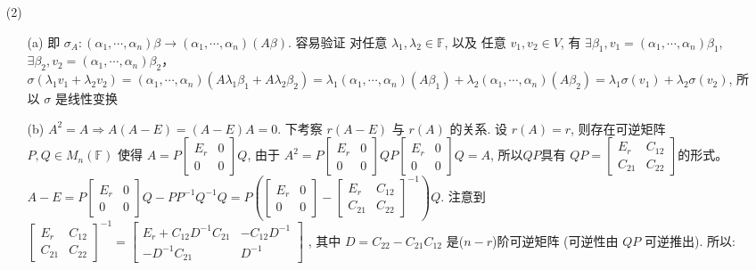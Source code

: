 \documentclass{article}
\begin{document}
\begin{spacing}{1.5}
\begin{enumerate}
\begin{itemize}
        \item [(2)] 
        \begin{itemize}
            \item [(a)] 即 $\sigma_A: (\alpha_1, \cdots, \alpha_n) \beta \to (\alpha_1,\cdots,\alpha_n) (A\beta)$. 容易验证 对任意 $\lambda_1, \lambda_2 \in \mathbb{F}$, 以及 任意 $v_1, v_2\in V$, 有 $\exists \beta_1, v_1 = (\alpha_1, \cdots, \alpha_n) \beta_1$, $\exists \beta_2, v_2 = (\alpha_1, \cdots, \alpha_n) \beta_2$， $\sigma(\lambda_1 v_1+ \lambda_2 v_2) = (\alpha_1, \cdots, \alpha_n) (A\lambda_1\beta_1 + A\lambda_2\beta_2) = \lambda_1(\alpha_1, \cdots, \alpha_n)(A\beta_1) + \lambda_2(\alpha_1, \cdots, \alpha_n)(A\beta_2) = \lambda_1 \sigma(v_1) + \lambda_2 \sigma(v_2)$, 所以 $\sigma$ 是线性变换
            \item [(b)] $A^2 = A \Rightarrow A(A-E) = (A-E)A = 0$. 下考察 $r(A-E)$ 与 $r(A)$ 的关系. 设 $r(A) = r$, 则存在可逆矩阵 $P, Q\in M_n(\mathbb{F})$ 使得 $A = P\left[\begin{array}{cc}E_r&0\\0&0\end{array}\right]Q$, 由于 $A^2 = P\left[\begin{array}{cc}E_r&0\\0&0\end{array}\right]QP\left[\begin{array}{cc}E_r&0\\0&0\end{array}\right]Q=A$, 所以$QP$具有 $QP=\left[\begin{array}{cc}E_r&C_{12}\\C_{21}&C_{22}\end{array}\right]$的形式。$A - E = P\left[\begin{array}{cc}E_r&0\\0&0\end{array}\right]Q - PP^{-1}Q^{-1}Q = P\left(\left[\begin{array}{cc}E_r&0\\0&0\end{array}\right] - \left[\begin{array}{cc}E_{r}&C_{12}\\C_{21}&C_{22}\end{array}\right]^{-1}\right)Q$. 注意到 $\left[\begin{array}{cc}E_r&C_{12}\\C_{21}&C_{22}\end{array}\right]^{-1} = \left[\begin{array}{cc}E_r + C_{12}D^{-1}C_{21}&-C_{12}D^{-1}\\-D^{-1}C_{21}&D^{-1}\end{array}\right]$ , 其中 $D = C_{22} - C_{21}C_{12}$ 是($n-r$)阶可逆矩阵 (可逆性由 $QP$ 可逆推出). 所以: 

\end{itemize}
\end{itemize}
\end{enumerate}
\end{spacing}
\end{document}
